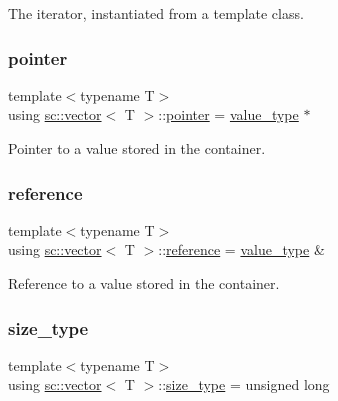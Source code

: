 The iterator, instantiated from a template class. 

\mbox{\label{classsc_1_1vector_a0348a6e1e249e051964a2bc94b05527a}} 
\subsubsection{\texorpdfstring{pointer}{pointer}}
{\footnotesize\ttfamily template$<$typename T$>$ \\
using \hyperlink{classsc_1_1vector}{sc\+::vector}$<$ T $>$\+::\hyperlink{classsc_1_1vector_a0348a6e1e249e051964a2bc94b05527a}{pointer} =  \hyperlink{classsc_1_1vector_ad37f5bfa688e43c420ed565e4bff6fac}{value\+\_\+type} $\ast$}



Pointer to a value stored in the container. 

\mbox{\label{classsc_1_1vector_a37394c8a6b82c4a0709737d7982e32b2}} 
\subsubsection{\texorpdfstring{reference}{reference}}
{\footnotesize\ttfamily template$<$typename T$>$ \\
using \hyperlink{classsc_1_1vector}{sc\+::vector}$<$ T $>$\+::\hyperlink{classsc_1_1vector_a37394c8a6b82c4a0709737d7982e32b2}{reference} =  \hyperlink{classsc_1_1vector_ad37f5bfa688e43c420ed565e4bff6fac}{value\+\_\+type} \&}



Reference to a value stored in the container. 

\mbox{\label{classsc_1_1vector_a48bf37ba1a6d0c13504414d86e27c399}} 
\subsubsection{\texorpdfstring{size\+\_\+type}{size\_type}}
{\footnotesize\ttfamily template$<$typename T$>$ \\
using \hyperlink{classsc_1_1vector}{sc\+::vector}$<$ T $>$\+::\hyperlink{classsc_1_1vector_a48bf37ba1a6d0c13504414d86e27c399}{size\+\_\+type} =  unsigned long}



